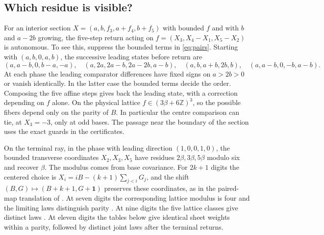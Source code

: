 \documentclass[11pt,reqno]{amsart}
\theoremstyle{remark}
\newcommand{\Z}{\mathbb Z}
\newcommand{\one}{\boldsymbol 1}
\begin{document}
\subsection*{Which residue is visible?}
For an interior section \(X=(a,b,f_3,a+f_4,b+f_5)\) with bounded \(f\) and with \(b\) and \(a-2b\) growing, the five-step return acting on \(f=(X_3,X_4-X_1,X_5-X_2)\) is autonomous. To see this, suppress the bounded terms in \eqref{eq:pairs}. Starting with \((a,b,0,a,b)\), the successive leading states before return are
\[
 (a,a-b,0,b-a,-a),\quad
 (a,2a,2a-b,2a-2b,a-b),\quad
 (a,b,a+b,2b,b),\quad
 (a,a-b,0,-b,a-b).
\]
At each phase the leading comparator differences have fixed signs on \(a>2b>0\) or vanish identically. In the latter case the bounded terms decide the order. Composing the five affine steps gives back the leading state, with a correction depending on \(f\) alone. On the physical lattice \(f\in(3\beta+6\Z)^3\), so the possible fibers depend only on the parity of \(B\). In particular the centre comparison can tie, at \(X_3=-3\), only at odd bases. The passage near the boundary of the section uses the exact guards in the certificates.

On the terminal ray, in the phase with leading direction \((1,0,0,1,0)\), the bounded transverse coordinates \(X_2,X_3,X_5\) have residues \(2\beta,3\beta,5\beta\) modulo six and recover \(\beta\). The modulus comes from base covariance. For \(2k+1\) digits the centered choice is \(X_i=iB-(k+1)\sum_{j<i}G_j\), and the shift \((B,G)\mapsto(B+k+1,G+\one)\) preserves these coordinates, as in the paired-map translation of \cite[Theorem~4]{G4}. At seven digits the corresponding lattice modulus is four and the limiting laws distinguish parity \cite{G5}. At nine digits the five lattice classes give distinct laws \cite{G4}. At eleven digits the tables below give identical sheet weights within a parity, followed by distinct joint laws after the terminal returns.
\end{document}

